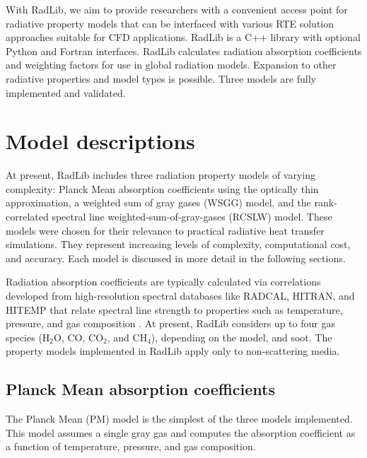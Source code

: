 \documentclass[preprint,12pt]{elsarticle}
\begin{document}
With RadLib, we aim to provide researchers with a convenient access point for radiative property models that can be interfaced with various RTE solution approaches suitable for CFD applications. RadLib is a C++ library with optional Python and Fortran interfaces. RadLib calculates radiation absorption coefficients and weighting factors for use in global radiation models. Expansion to other radiative properties and model types is possible. Three models are fully implemented and validated. 


\section{Model descriptions} \label{s:models}

At present, RadLib includes three radiation property models of varying complexity: Planck Mean absorption coefficients using the optically thin approximation, a weighted sum of gray gases (WSGG) model, and the rank-correlated spectral line weighted-sum-of-gray-gases (RCSLW) model. These models were chosen for their relevance to practical radiative heat transfer simulations. They represent increasing levels of complexity, computational cost, and accuracy. Each model is discussed in more detail in the following sections.

Radiation absorption coefficients are typically calculated via correlations developed from high-resolution spectral databases like RADCAL, HITRAN, and HITEMP \citep{Grosshandler_1993,Rothman_2010} that relate spectral line strength to properties such as temperature, pressure, and gas composition \citep{Zhang_2002b}. At present, RadLib considers up to four gas species (H$_2$O, CO, CO$_2$, and CH$_4$), depending on the model, and soot. The property models implemented in RadLib apply only to non-scattering media. 


\subsection{Planck Mean absorption coefficients} \label{s:planckmean}

The Planck Mean (PM) model is the simplest of the three models implemented. This model assumes a single gray gas and computes the absorption coefficient as a function of temperature, pressure, and gas composition. 
\end{document}

